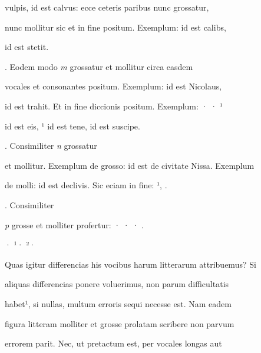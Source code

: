 vulpis,   id est calvus: ecce ceteris paribus nunc grossatur,

nunc mollitur sic et in fine positum. Exemplum:  id est calibs,

\splitlines

 id est stetit.

\indentK {}. Eodem modo \textit{m} grossatur et mollitur circa easdem

\fulllines

vocales et consonantes positum. Exemplum:  id est Nicolaus,  


id est trahit. Et in fine diccionis positum. Exemplum: · · ¹

\splitlines


id est eis, ¹ id est tene,  id est suscipe.

\indentK {}. Consimiliter \textit{n} grossatur

\fulllines

et mollitur. Exemplum de grosso:  id est de civitate Nissa. Exemplum

\splitlines


de molli:  id est declivis. Sic eciam in fine: ¹, .


\indentK {}. Consimiliter


\fulllines

\textit{p} grosse et molliter profertur: · ·  · .


· ¹· ²·

Quas igitur differencias his vocibus harum litterarum attribuemus? Si

aliquas differencias ponere voluerimus, non parum difficultatis 


habet¹, si nullas, multum erroris sequi necesse est. Nam eadem 

figura litteram molliter et grosse prolatam scribere non parvum

errorem parit. Nec, ut pretactum est, per vocales longas aut

